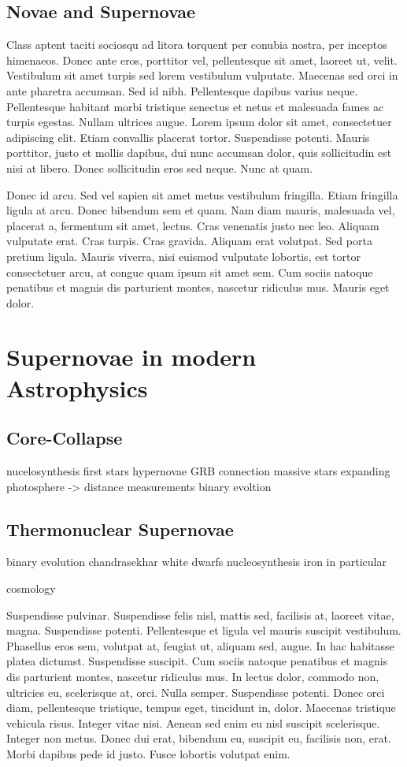 \subsection{Novae and Supernovae}
\label{sec:novae_supernovae}

Class aptent taciti sociosqu ad litora torquent per conubia nostra,
per inceptos himenaeos. Donec ante eros, porttitor vel, pellentesque
sit amet, laoreet ut, velit. Vestibulum sit amet turpis sed lorem
vestibulum vulputate. Maecenas sed orci in ante pharetra accumsan. Sed
id nibh. Pellentesque dapibus varius neque. Pellentesque habitant
morbi tristique senectus et netus et malesuada fames ac turpis
egestas. Nullam ultrices augue. Lorem ipsum dolor sit amet,
consectetuer adipiscing elit. Etiam convallis placerat
tortor. Suspendisse potenti. Mauris porttitor, justo et mollis
dapibus, dui nunc accumsan dolor, quis sollicitudin est nisi at
libero. Donec sollicitudin eros sed neque. Nunc at quam.

Donec id arcu. Sed vel sapien sit amet metus vestibulum
fringilla. Etiam fringilla ligula at arcu. Donec bibendum sem et
quam. Nam diam mauris, malesuada vel, placerat a, fermentum sit amet,
lectus. Cras venenatis justo nec leo. Aliquam vulputate erat. Cras
turpis. Cras gravida. Aliquam erat volutpat. Sed porta pretium
ligula. Mauris viverra, nisi euismod vulputate lobortis, est tortor
consectetuer arcu, at congue quam ipsum sit amet sem. Cum sociis
natoque penatibus et magnis dis parturient montes, nascetur ridiculus
mus. Mauris eget dolor.

\section{Supernovae in modern Astrophysics}
\label{sec:sn_modern_astro}
\subsection{Core-Collapse}
nucelosynthesis
first stars
hypernovae
GRB connection
massive stars
expanding photosphere -> distance measurements
binary evoltion

\subsection{Thermonuclear Supernovae}
binary evolution
chandrasekhar
white dwarfs
nucleosynthesis
iron in particular

cosmology


Suspendisse pulvinar. Suspendisse felis nisl, mattis sed, facilisis
at, laoreet vitae, magna. Suspendisse potenti. Pellentesque et ligula
vel mauris suscipit vestibulum. Phasellus eros sem, volutpat at,
feugiat ut, aliquam sed, augue. In hac habitasse platea
dictumst. Suspendisse suscipit. Cum sociis natoque penatibus et magnis
dis parturient montes, nascetur ridiculus mus. In lectus dolor,
commodo non, ultricies eu, scelerisque at, orci. Nulla
semper. Suspendisse potenti. Donec orci diam, pellentesque tristique,
tempus eget, tincidunt in, dolor. Maecenas tristique vehicula
risus. Integer vitae nisi. Aenean sed enim eu nisl suscipit
scelerisque. Integer non metus. Donec dui erat, bibendum eu, suscipit
eu, facilisis non, erat. Morbi dapibus pede id justo. Fusce lobortis
volutpat enim.

